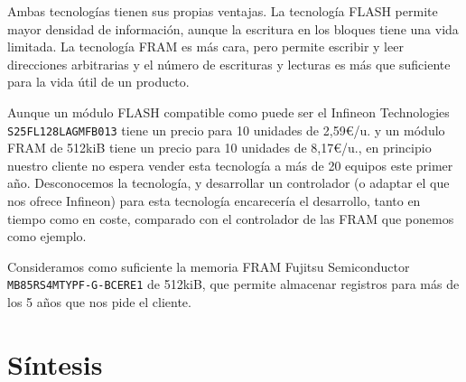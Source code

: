 Ambas tecnologías tienen sus propias ventajas. La tecnología FLASH permite mayor densidad de información,
aunque la escritura en los bloques tiene una vida limitada. La tecnología FRAM es más cara, pero permite
escribir y leer direcciones arbitrarias y el número de escrituras y lecturas es más que suficiente para la vida
útil de un producto.

Aunque un módulo FLASH compatible como puede ser el Infineon Technologies \linebreak \texttt{S25FL128LAGMFB013} tiene un
precio para 10 unidades de 2,59€/u. y un módulo FRAM de 512kiB tiene un precio para 10 unidades de
8,17€/u., en principio nuestro cliente no espera vender esta tecnología a más de 20 equipos este primer año.
Desconocemos la tecnología, y desarrollar un controlador (o adaptar el que nos ofrece Infineon) para esta tecnología
encarecería el desarrollo, tanto en tiempo como en coste, comparado con el controlador de las FRAM que ponemos como ejemplo.

Consideramos como suficiente la memoria FRAM Fujitsu Semiconductor \linebreak \texttt{MB85RS4MTYPF-G-BCERE1} de 512kiB,
que permite almacenar registros para más de los 5 años que nos pide el cliente.

\section{Síntesis}

